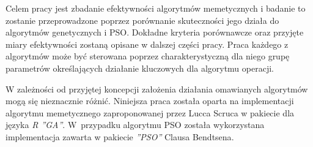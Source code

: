\par
Celem pracy jest zbadanie efektywności algorytmów memetycznych i badanie to zostanie przeprowadzone poprzez porównanie skuteczności jego działa do algorytmów genetycznych i PSO. Dokładne kryteria porównawcze oraz przyjęte miary efektywności zostaną opisane w dalszej części pracy. Praca każdego z algorytmów może być sterowana poprzez charakterystyczną dla niego grupę parametrów określających działanie kluczowych dla algorytmu operacji. 
\par
W zależności od przyjętej koncepcji założenia działania omawianych algorytmów mogą się nieznacznie różnić. Niniejsza praca została oparta na implementacji algorytmu memetycznego zaproponowanej przez Lucca Scruca w pakiecie dla języka \emph{R ''GA''}\cite{gaPackage}. W~przypadku algorytmu PSO została wykorzystana implementacja zawarta w pakiecie \emph{''PSO''} Clausa Bendtsena\cite{psoPackage}. 

